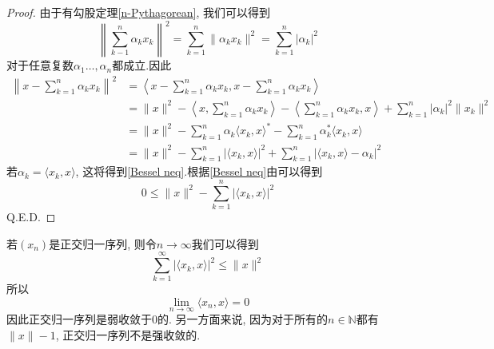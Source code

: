 \documentclass[a4paper,11pt]{book}
\newtheorem{proof}{证明}[section]
\begin{document}
\begin{proof}
  由于有勾股定理\eqref{n-Pythagorean}, 我们可以得到
  \begin{equation*}
    \left\|\sum_{k-1}^{n}\alpha_k x_k\right\|^2=\sum_{k=1}^{n}\|\alpha_k x_k\|^2=\sum_{k=1}^{n}|\alpha_k|^2
  \end{equation*}
  对于任意复数$\alpha_1\dots,\alpha_n$都成立.因此
  \begin{equation*}
  \begin{split}
     \left\|x-\sum_{k=1}^{n}\alpha_k x_k\right\|^2&=\left\langle x-\sum_{k=1}^{n}\alpha_kx_k,x-\sum_{k=1}^{n}\alpha_kx_k\right\rangle \\
       &=\|x\|^2-\left\langle x,\sum_{k=1}^{n}\alpha_kx_k\right\rangle-\left\langle\sum_{k=1}^{n}\alpha_kx_k,x\right\rangle+\sum_{k=1}^{n}|\alpha_k|^2\|x_k\|^2 \\
       &=\|x\|^2-\sum_{k=1}^{n}\alpha_k\langle x_k,x\rangle^*-\sum_{k=1}^{n}\alpha_k^*\langle x_k,x\rangle \\
       &=\|x\|^2-\sum_{k=1}^{n}|\langle x_k,x\rangle|^2+\sum_{k=1}^{n}|\langle x_k,x\rangle-\alpha_k|^2
  \end{split}
  \end{equation*}
  若$\alpha_k=\langle x_k,x\rangle$, 这将得到\eqref{Bessel neq}.根据\eqref{Bessel neq}由可以得到
  \begin{equation*}
    0\leq\|x\|^2-\sum_{k=1}^{n}|\langle x_k,x\rangle|^2
  \end{equation*}
  Q.E.D.
\end{proof}
若$(x_n)$是正交归一序列, 则令$n\to \infty$我们可以得到
\begin{equation}\label{Bessel neq infty}
  \sum_{k=1}^{\infty}|\langle x_k,x\rangle|^2\leq\|x\|^2
\end{equation}
所以
\begin{equation*}
  \lim_{n\to\infty}\langle x_n,x\rangle=0
\end{equation*}
因此正交归一序列是弱收敛于$0$的. 另一方面来说, 因为对于所有的$n\in \mathbb{N}$都有$\|x\|-1$, 正交归一序列不是强收敛的.
\end{document}
